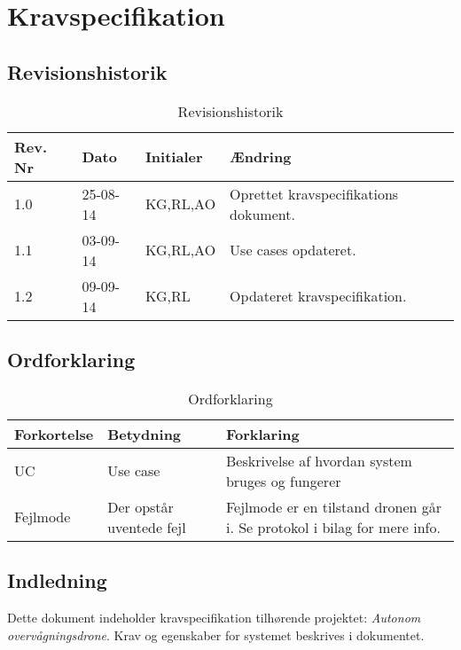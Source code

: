 \chapter{Kravspecifikation}

\section{Revisionshistorik}
\begin{table}[H]
	\centering
		\begin{tabular}{|p{2 cm}|p{2 cm}|p{3 cm}|p{6 cm}|} 
		\hline
			\textbf{Rev. Nr} & \textbf{Dato}		& \textbf{Initialer} 	& \textbf{Ændring} \\ \hline
			1.0 	& 25-08-14	& KG,RL,AO		& Oprettet kravspecifikations dokument.	\\ \hline
			1.1 	& 03-09-14	& KG,RL,AO		& Use cases opdateret.\\ \hline
			1.2 	& 09-09-14	& KG,RL			& Opdateret kravspecifikation.\\ \hline
		\end{tabular}
	\caption{Revisionshistorik}
\end{table}

\vspace{1.5cm}

\section{Ordforklaring}
\begin{table}[H]
	\centering
		\begin{tabular}{|p{2.5cm}|p{4.5 cm}|p{6.5 cm}|} 
		\hline
			\textbf{Forkortelse} & \textbf{Betydning} & \textbf{Forklaring} \\ \hline
			UC & Use case & Beskrivelse af hvordan system bruges og fungerer \\ \hline
			Fejlmode & Der opstår uventede fejl & Fejlmode er en tilstand dronen går i. Se protokol i bilag for mere info. \\ \hline
		\end{tabular}
	\caption{Ordforklaring}
\end{table}

\vspace{2cm}

\section{Indledning}

Dette dokument indeholder kravspecifikation tilhørende projektet: \textit{Autonom overvågningsdrone}. Krav og egenskaber for systemet beskrives i dokumentet.